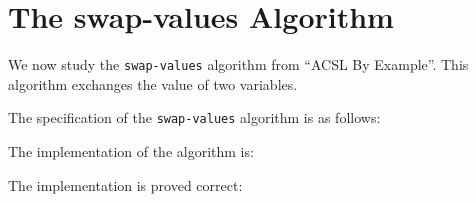 \clearpage
\section{The \textsf{swap-values} Algorithm}
\label{swap-values}

We now study the \texttt{swap-values} algorithm from ``ACSL By Example''.
This algorithm exchanges the value of two variables.

The specification of the \texttt{swap-values} algorithm is as follows:


The implementation of the algorithm is:


The implementation is proved correct:


